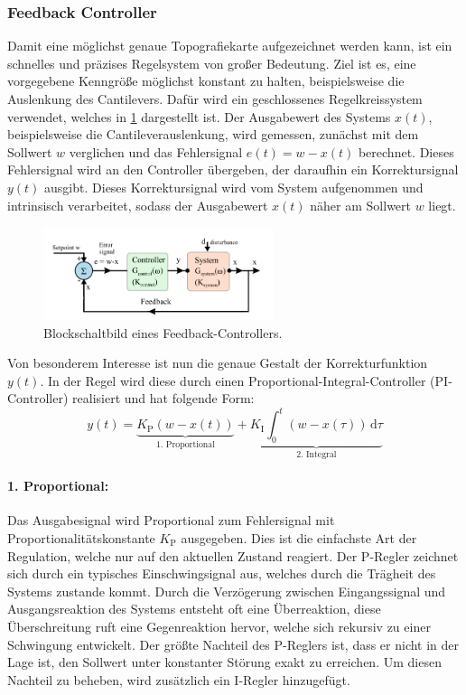 \subsubsection{Feedback Controller}
Damit eine möglichst genaue Topografiekarte aufgezeichnet werden kann, ist ein schnelles und präzises Regelsystem von
großer Bedeutung.
Ziel ist es, eine vorgegebene Kenngröße möglichst konstant zu halten, beispielsweise die Auslenkung des Cantilevers.
Dafür wird ein geschlossenes Regelkreissystem verwendet, welches in \cref{fig:afm_controller} dargestellt ist.
Der Ausgabewert des Systems $x(t)$, beispielsweise die Cantileverauslenkung, wird gemessen, zunächst mit dem
Sollwert $w$ verglichen und das Fehlersignal $e(t)=w-x(t)$ berechnet.
Dieses Fehlersignal wird an den Controller übergeben, der daraufhin ein Korrektursignal $y(t)$ ausgibt.
Dieses Korrektursignal wird vom System aufgenommen und intrinsisch verarbeitet, sodass der Ausgabewert $x(t)$ näher am
Sollwert $w$ liegt.\autocite[99-101]{afm-buch}
\begin{figure}
    \centering
    \includegraphics[width=0.6\textwidth]{../assets/messmethoden/afm/03_controller}
    \caption{Blockschaltbild eines Feedback-Controllers. }
    \label{fig:afm_controller}
\end{figure}
Von besonderem Interesse ist nun die genaue Gestalt der Korrekturfunktion $y(t)$.
In der Regel wird diese durch einen Proportional-Integral-Controller (PI-Controller) realisiert und hat folgende Form:
\begin{equation*}
    y(t)=\underbrace{ K_{\mathrm{P}}(w-x(t)) }_{ \text{1. Proportional} }+\underbrace{ K_{\mathrm{I}}\int_{0}^{t}
        (w-x(\tau)) \, \mathrm{d}\tau }_{ \text{2. Integral} }
\end{equation*}\autocite[104-105]{afm-buch}

\paragraph{1. Proportional:}
Das Ausgabesignal wird Proportional zum Fehlersignal mit Proportionalitätskonstante $K_{\mathrm{P}}$ ausgegeben.
Dies ist die einfachste Art der Regulation, welche nur auf den aktuellen Zustand reagiert.
Der P-Regler zeichnet sich durch ein typisches Einschwingsignal aus, welches durch die Trägheit des Systems zustande
kommt.
Durch die Verzögerung zwischen Eingangssignal und Ausgangsreaktion des Systems entsteht oft eine Überreaktion,
diese Überschreitung ruft eine Gegenreaktion hervor, welche sich rekursiv zu einer Schwingung entwickelt.
Der größte Nachteil des P-Reglers ist, dass er nicht in der Lage ist, den Sollwert unter konstanter Störung
exakt zu erreichen.
Um diesen Nachteil zu beheben, wird zusätzlich ein I-Regler hinzugefügt.\autocite[101-102]{afm-buch}

